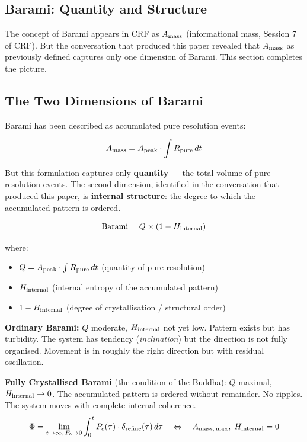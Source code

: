 \documentclass[12pt, a4paper]{article}
\begin{document}
\subsection*{Barami: Quantity and Structure}

The concept of Barami appears in CRF as $A_{\rm mass}$ (informational mass,
Session 7 of CRF). But the conversation that produced this paper revealed
that $A_{\rm mass}$ as previously defined captures only one dimension of Barami.
This section completes the picture.

\subsection{The Two Dimensions of Barami}

Barami has been described as accumulated pure resolution events:

\[
  A_{\rm mass} = A_{\rm peak} \cdot \int R_{\rm pure}\,dt
\]

But this formulation captures only \textbf{quantity} --- the total volume of pure
resolution events. The second dimension, identified in the conversation that produced
this paper, is \textbf{internal structure}: the degree to which the accumulated
pattern is ordered.

\begin{formalbox}[title={Barami: Complete Two-Dimensional Definition}]
\[
  \mathrm{Barami} = Q \times (1 - H_{\rm internal})
\]

where:
\begin{itemize}
\item $Q = A_{\rm peak} \cdot \int R_{\rm pure}\,dt$ \quad (quantity of pure resolution)
\item $H_{\rm internal}$ \quad (internal entropy of the accumulated pattern)
\item $1 - H_{\rm internal}$ \quad (degree of crystallisation / structural order)
\end{itemize}

\textbf{Ordinary Barami:} $Q$ moderate, $H_{\rm internal}$ not yet low.
Pattern exists but has turbidity. The system has tendency (\textit{inclination})
but the direction is not fully organised. Movement is in roughly the right direction
but with residual oscillation.

\textbf{Fully Crystallised Barami} (the condition of the Buddha):
$Q$ maximal, $H_{\rm internal} \to 0$.
The accumulated pattern is ordered without remainder.
No ripples. The system moves with complete internal coherence.
\[
  \Phi = \lim_{t\to\infty,\, F_b\to 0} \int_0^t P_c(\tau)\cdot\delta_{\rm refine}(\tau)\,d\tau
  \quad \Leftrightarrow \quad
  A_{\rm mass,\, max},\; H_{\rm internal} = 0
\]
\end{formalbox}
\end{document}
